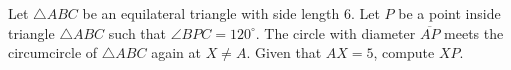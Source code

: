 Let $\triangle A B C$ be an equilateral triangle with side length $6$. Let $P$ be a point inside triangle $\triangle A B C$ such that $\angle B P C=120^{\circ}$. The circle with diameter $\overline{A P}$ meets the circumcircle of $\triangle A B C$ again at $X \neq A$. Given that $A X=5$, compute $X P$.